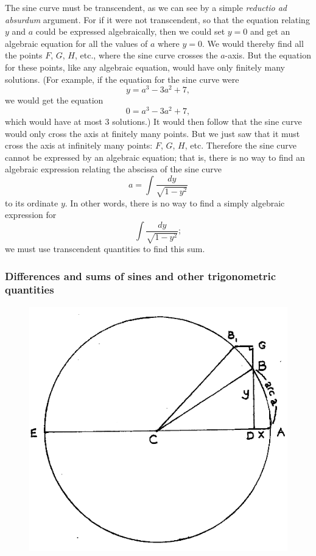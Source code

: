 \documentclass[polutonikogreek,english,twoside,openright]{article}
\begin{document}
\label{sintran} The sine curve must be transcendent, as we can see by a simple {\em reductio ad absurdum} argument.  For if it were not transcendent, so that the equation relating $y$ and $a$ could be expressed algebraically, then we could set $y =0$ and get an algebraic equation for all the values of $a$ where $y=0$.  We would thereby find all the points $F$, $G$, $H$, etc., where the sine curve crosses the $a$-axis.  But the equation for these points, like any algebraic equation, would have only finitely many solutions.  
 (For example, if the equation for the sine curve were
 $$y= a^3 -3a^2 + 7,$$
 we would get the equation
 $$ 0 = a^3 -3a^2 +7,$$
 which would have at most 3 solutions.) It would then follow that the sine curve would only cross the axis at finitely many points.  But we just saw that it must cross the axis at infinitely many points: $F$, $G$, $H$, etc.  Therefore the sine curve cannot be expressed by an algebraic equation; that is, there is no way to find an algebraic expression relating the  abscissa of the sine curve
 $$a = \int\! \frac{dy}{\sqrt{1-y^2}}$$
 to its ordinate $y$.  In other words, there is no way to find a simply algebraic expression for 
 $$\int\! \frac{dy}{\sqrt{1-y^2}};$$
 we must use transcendent quantities to find this sum.
 
\subsubsection*{Differences and sums of sines and other trigonometric quantities}


\addtocounter{figure}{-2}
\begin{figure}[hp]
\begin{center}
\includegraphics[width=.65\textwidth]{fig/Figure42}
\caption{}
\label{circarc3}
\vspace{-10pt}
\end{center}
\end{figure}
\end{document}
